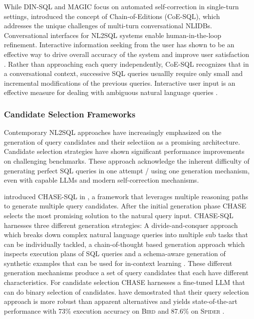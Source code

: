 While DIN-SQL and MAGIC focus on automated self-correction in single-turn settings, \cite{CoE-SQL} introduced the concept of
Chain-of-Editions (CoE-SQL), which addresses the unique challenges of multi-turn conversational NLIDBs. Conversational interfaces
for NL2SQL systems enable human-in-the-loop refinement. Interactive information seeking from the user has shown to be an
effective way to drive overall accuracy of the system and improve user satisfaction \citep{NALIR}. Rather than approaching
each query independently, CoE-SQL recognizes that in a conversational context, successive SQL queries usuallly require only
small and incremental modifications of the previous queries. Interactive user input is an effective measure for dealing with
ambiguous natural language queries \citep{CoE-SQL, UnnaturalQueryLanguage, NALIR}.

\subsubsection{Candidate Selection Frameworks}

Contemporary NL2SQL approaches have increasingly emphasized on the generation of query candidates and their selectiion as a
promising architecture. Candidate selection strategies have shown significant performance improvements on challenging benchmarks.
These approach acknowledge the inherent difficulty of generating perfect SQL queries in one attempt / using one generation
mechanism, even with capable LLMs and modern self-correction mechanisms.

\cite{CHASE} introduced CHASE-SQL in \citeyear{CHASE}, a framework that leverages multiple reasoning paths to generate multiple
query candidates. After the initial generation phase CHASE selects the most promising solution to the natural query input.
CHASE-SQL harnesses three different generation strategies: A divide-and-conquer approach which breaks down complex natural
language queries into multiple sub tasks that can be individually tackled, a chain-of-thought based generation approach which
inspects execution plans of SQL queries and a schema-aware generation of synthetic examples that can be used for in-context
learning \citep{CHASE}. These different generation mechanisms produce a set of query candidates that each have different
characteristics. For candidate selection CHASE harnesses a fine-tuned LLM that can do binary selection of candidates.
\citeauthor{CHASE} have demostrated that their query selection approach is more robust than apparent alternatives and yields
state-of-the-art performance with 73\% execution accuracy on \textsc{Bird} and 87.6\% on \textsc{Spider} \citep{CHASE}.


